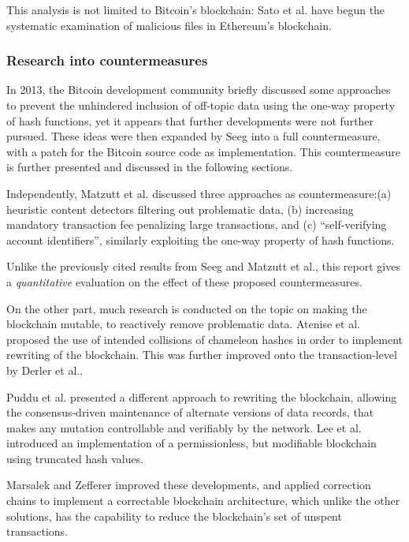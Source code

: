 \documentclass[a4paper,11pt,titlepage]{scrbook}
\begin{document}
This analysis is not limited to Bitcoin's blockchain:\@ 
Sato et al.\@ \cite{sato_threat_2020} have begun the systematic examination of malicious files in Ethereum's blockchain.


\subsubsection*{Research into countermeasures}

In 2013, the Bitcoin development community briefly discussed some approaches to prevent the unhindered inclusion of off-topic data \cite{maxwell_prevent_2013} using the one-way property of hash functions, yet it appears that further developments were not further pursued.
These ideas were then expanded by Seeg \cite{seeg_hardening_2018} into a full countermeasure, with a patch for the Bitcoin source code as implementation.
This countermeasure is further presented and discussed in the following sections.

Independently, Matzutt et al.\@ \cite{matzutt_thwarting_2018} discussed three approaches as countermeasure:\@ (a) heuristic content detectors filtering out problematic data, (b) increasing mandatory transaction fee penalizing large transactions, and (c) \enquote{self-verifying account identifiers}, similarly exploiting the one-way property of hash functions.

Unlike the previously cited results from Seeg and Matzutt et al., this report gives a \emph{quantitative} evaluation on the effect of these proposed countermeasures.

On the other part, much research is conducted on the topic on making the blockchain mutable, to reactively remove problematic data.
Atenise et al.\@ \cite{ateniese_redactable_2017} proposed the use of intended collisions of chameleon hashes in order to implement rewriting of the blockchain.
This was further improved onto the transaction-level by Derler et al.\@ \cite{derler_fine-grained_2019}.

Puddu et al.\@ \cite{puddu_chain:_2017} presented a different approach to rewriting the blockchain, allowing the consensus-driven maintenance of alternate versions of data records, that makes any mutation controllable and verifiably by the network.
Lee et al.\@ \cite{lee_modifiable_2019} introduced an implementation of a permissionless, but modifiable blockchain using truncated hash values. 

Marsalek and Zefferer \cite{marsalek_correctable_2019} improved these developments, and applied correction chains to implement a correctable blockchain architecture, which unlike the other solutions, has the capability to reduce the blockchain's set of unspent transactions.
\end{document}
